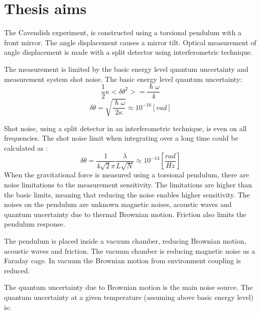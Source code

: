 \documentclass[\main/master.tex]{subfiles}
\begin{document}
\chapter{Thesis aims}\label{chapter:Thesis aims}

The Cavendish experiment, is constructed using a torsional pendulum with a front mirror. The angle displacement causes a mirror tilt. Optical measurement of angle displacement is made with a split detector using interferometric technique.
\par\noindent
The measurement is limited by the basic energy level quantum uncertainty and measurement system shot noise. The basic energy level quantum uncertainty:
\begin{equation}
\frac{1}{2}\kappa <\delta\theta^2>= \frac{\hslash\omega}{4}    \label{eqn:basic uncertainty}
\end{equation}
\begin{equation}
\delta\theta= \sqrt{\frac{\hslash\omega}{2\kappa}} \approx 10^{-16} [rad]    \label{eqn:basic uncertainty}
\end{equation}

\noindent
Shot noise, using a split detector in an interferometric technique, is even on all frequencies. The shot noise limit when integrating over a long time could be calculated as \cite{howell2019}:
\begin{equation}
\delta\theta = \frac{1}{4\sqrt{2}\pi}\frac{\lambda}{L\sqrt{N}} \approx
10^{-14} [\frac{rad}{Hz}]    \label{eqn:gravitation_torque}
\end{equation}
When the gravitational force is measured using a torsional pendulum, there are noise limitations to the measurement sensitivity. The limitations are higher than the basic limits, meaning that reducing the noise enables higher sensitivity. The noises on the pendulum are unknown magnetic noises, acoustic waves and quantum uncertainty due to thermal Brownian motion. Friction also limits the pendulum response. 
\par\noindent
The pendulum is placed inside a vacuum chamber, reducing Brownian motion, acoustic waves and friction. The vacuum chamber is reducing magnetic noise as a Faraday cage. In vacuum the Brownian motion from environment coupling is reduced.
\par\noindent
The quantum uncertainty due to Brownian motion is the main noise source. The quantum uncertainty at a given temperature (assuming above basic energy level) is:
\end{document}
